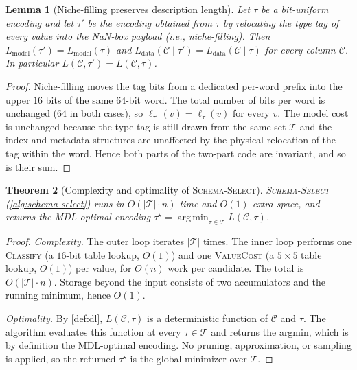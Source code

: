 \documentclass[10pt]{article}
\newtheorem{theorem}{Theorem}
\newtheorem{lemma}[theorem]{Lemma}
\theoremstyle{definition}
\theoremstyle{remark}
\newcommand{\Ccal}{\mathcal{C}}
\newcommand{\Tcal}{\mathcal{T}}
\newcommand{\Lmodel}{L_{\mathrm{model}}}
\newcommand{\Ldata}{L_{\mathrm{data}}}
\DeclareMathOperator*{\argmin}{arg\,min}
\begin{document}
\begin{lemma}[Niche-filling preserves description length]\label{lem:niche}
Let $\tau$ be a bit-uniform encoding and let $\tau'$ be the encoding
obtained from $\tau$ by relocating the type tag of every value into the
NaN-box payload (i.e., niche-filling). Then
$\Lmodel(\tau') = \Lmodel(\tau)$ and $\Ldata(\Ccal \mid \tau') = \Ldata(\Ccal \mid \tau)$
for every column $\Ccal$. In particular $L(\Ccal, \tau') = L(\Ccal, \tau)$.
\end{lemma}

\begin{proof}
Niche-filling moves the tag bits from a dedicated per-word prefix into the
upper $16$ bits of the same $64$-bit word. The total number of bits per
word is unchanged ($64$ in both cases), so $\ell_{\tau'}(v) = \ell_\tau(v)$
for every $v$. The model cost is unchanged because the type tag is still
drawn from the same set $\Tcal$ and the index and metadata structures are
unaffected by the physical relocation of the tag within the word. Hence
both parts of the two-part code are invariant, and so is their sum.
\end{proof}

\begin{theorem}[Complexity and optimality of \textsc{Schema-Select}]\label{thm:complexity}
\textsc{Schema-Select} (\cref{alg:schema-select}) runs in $O(|\Tcal| \cdot n)$
time and $O(1)$ extra space, and returns the MDL-optimal encoding
$\tau^\star = \argmin_{\tau \in \Tcal} L(\Ccal, \tau)$.
\end{theorem}

\begin{proof}
\emph{Complexity.} The outer loop iterates $|\Tcal|$ times. The inner
loop performs one \textsc{Classify} (a $16$-bit table lookup, $O(1)$) and
one \textsc{ValueCost} (a $5 \times 5$ table lookup, $O(1)$) per value,
for $O(n)$ work per candidate. The total is $O(|\Tcal| \cdot n)$. Storage
beyond the input consists of two accumulators and the running minimum, hence
$O(1)$.

\emph{Optimality.} By \cref{def:dl}, $L(\Ccal, \tau)$ is a deterministic
function of $\Ccal$ and $\tau$. The algorithm evaluates this function at
every $\tau \in \Tcal$ and returns the argmin, which is by definition the
MDL-optimal encoding. No pruning, approximation, or sampling is applied,
so the returned $\tau^\star$ is the global minimizer over $\Tcal$.
\end{proof}
\end{document}
